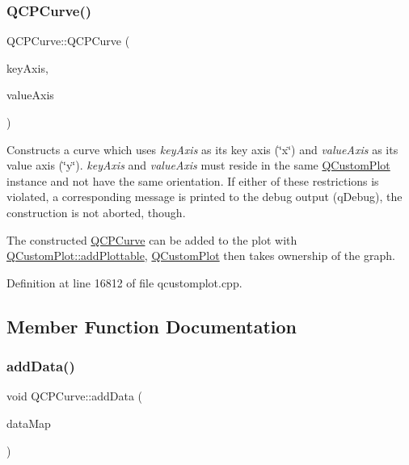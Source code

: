 \subsubsection{\texorpdfstring{Q\+C\+P\+Curve()}{QCPCurve()}}
{\footnotesize\ttfamily Q\+C\+P\+Curve\+::\+Q\+C\+P\+Curve (\begin{DoxyParamCaption}\item[{\hyperlink{class_q_c_p_axis}{Q\+C\+P\+Axis} $\ast$}]{key\+Axis,  }\item[{\hyperlink{class_q_c_p_axis}{Q\+C\+P\+Axis} $\ast$}]{value\+Axis }\end{DoxyParamCaption})\hspace{0.3cm}{\ttfamily [explicit]}}

Constructs a curve which uses {\itshape key\+Axis} as its key axis (\char`\"{}x\char`\"{}) and {\itshape value\+Axis} as its value axis (\char`\"{}y\char`\"{}). {\itshape key\+Axis} and {\itshape value\+Axis} must reside in the same \hyperlink{class_q_custom_plot}{Q\+Custom\+Plot} instance and not have the same orientation. If either of these restrictions is violated, a corresponding message is printed to the debug output (q\+Debug), the construction is not aborted, though.

The constructed \hyperlink{class_q_c_p_curve}{Q\+C\+P\+Curve} can be added to the plot with \hyperlink{class_q_custom_plot_ab7ad9174f701f9c6f64e378df77927a6}{Q\+Custom\+Plot\+::add\+Plottable}, \hyperlink{class_q_custom_plot}{Q\+Custom\+Plot} then takes ownership of the graph. 

Definition at line 16812 of file qcustomplot.\+cpp.



\subsection{Member Function Documentation}
\mbox{\label{class_q_c_p_curve_a4e24023c3b9ac75440c7a260172c99af}} 
\subsubsection{\texorpdfstring{add\+Data()}{addData()}\hspace{0.1cm}{\footnotesize\ttfamily [1/5]}}
{\footnotesize\ttfamily void Q\+C\+P\+Curve\+::add\+Data (\begin{DoxyParamCaption}\item[{const \hyperlink{qcustomplot_8h_a444d37ec9cb2951b3a7fe443c34d1658}{Q\+C\+P\+Curve\+Data\+Map} \&}]{data\+Map }\end{DoxyParamCaption})}


